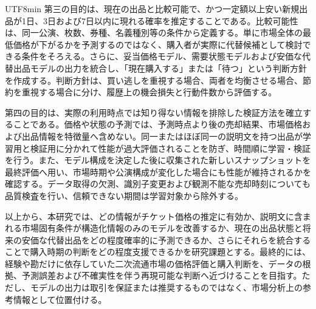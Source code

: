 \documentclass[a4paper,12pt]{report}
\begin{document}
\begin{CJK}{UTF8}{min}
第三の目的は、現在の出品と比較可能で、かつ一定額以上安い新規出品が1日、3日および7日以内に現れる確率を推定することである。比較可能性は、同一公演、枚数、券種、名義種別等の条件から定義する。単に市場全体の最低価格が下がるかを予測するのではなく、購入者が実際に代替候補として検討できる条件をそろえる。さらに、妥当価格モデル、需要状態モデルおよび安価な代替出品モデルの出力を統合し、「現在購入する」または「待つ」という判断方針を作成する。判断方針は、買い逃しを重視する場合、両者を均衡させる場合、節約を重視する場合に分け、履歴上の機会損失と行動件数から評価する。

第四の目的は、実際の利用時点では知り得ない情報を排除した検証方法を確立することである。価格や状態の予測では、予測時点より後の売却結果、市場価格および出品情報を特徴量へ含めない。同一またはほぼ同一の説明文を持つ出品が学習用と検証用に分かれて性能が過大評価されることを防ぎ、時間順に学習・検証を行う。また、モデル構成を決定した後に収集された新しいスナップショットを最終評価へ用い、市場時期や公演構成が変化した場合にも性能が維持されるかを確認する。データ取得の欠測、識別子変更および観測不能な売却時刻についても品質検査を行い、信頼できない期間は学習対象から除外する。

以上から、本研究では、どの情報がチケット価格の推定に有効か、説明文に含まれる市場固有条件が構造化情報のみのモデルを改善するか、現在の出品状態と将来の安価な代替出品をどの程度確率的に予測できるか、さらにそれらを統合することで購入時期の判断をどの程度支援できるかを研究課題とする。最終的には、経験や勘だけに依存していた二次流通市場の価格評価と購入判断を、データの根拠、予測誤差および不確実性を伴う再現可能な判断へ近づけることを目指す。ただし、モデルの出力は取引を保証または推奨するものではなく、市場分析上の参考情報として位置付ける。

\end{CJK}
\end{document}
